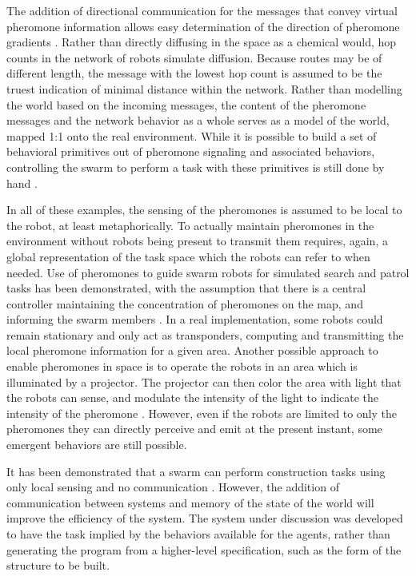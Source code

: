 The addition of directional communication for the messages that convey virtual pheromone information allows easy determination of the direction of pheromone gradients \citep{payton2001pheromone}.
Rather than directly diffusing in the space as a chemical would, hop counts in the network of robots simulate diffusion. 
Because routes may be of different length, the message with the lowest hop count is assumed to be the truest indication of minimal distance within the network. 
Rather than modelling the world based on the incoming messages, the content of the pheromone messages and the network behavior as a whole serves as a model of the world, mapped 1:1 onto the real environment. 
While it is possible to build a set of behavioral primitives out of pheromone signaling and associated behaviors, controlling the swarm to perform a task with these primitives is still done by hand \citep{payton2003compound}.

In all of these examples, the sensing of the pheromones is assumed to be local to the robot, at least metaphorically. 
To actually maintain pheromones in the environment without robots being present to transmit them requires, again, a global representation of the task space which the robots can refer to when needed. 
Use of pheromones to guide swarm robots for simulated search and patrol tasks has been demonstrated, with the assumption that there is a central controller maintaining the concentration of pheromones on the map, and informing the swarm members \citep{coppin2012controlling}. 
In a real implementation, some robots could remain stationary and only act as transponders, computing and transmitting the local pheromone information for a given area. 
Another possible approach to enable pheromones in space is to operate the robots in an area which is illuminated by a projector. 
The projector can then color the area with light that the robots can sense, and modulate the intensity of the light to indicate the intensity of the pheromone \citep{arvin2015cosvarphi,diaz2017human}. 
However, even if the robots are limited to only the pheromones they can directly perceive and emit at the present instant, some emergent behaviors are still possible. 


It has been demonstrated that a swarm can perform construction tasks using only local sensing and no communication \citep{wawerla2002collective, bowyer2000automated}.
However, the addition of communication between systems and memory of the state of the world will improve the efficiency of the system.
The system under discussion was developed to have the task implied by the behaviors available for the agents, rather than generating the program from a higher-level specification, such as the form of the structure to be built.

